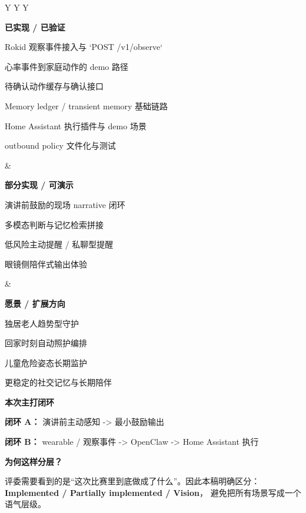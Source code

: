 \documentclass[11pt,fontset=none]{ctexart}
\newcommand{\PageDivider}{\vspace{0.7em}{\color{MiraMuted}\rule{\linewidth}{0.55pt}}\vspace{0.45em}}
\begin{document}
\begin{tabularx}{\linewidth}{Y Y Y}
\begin{greenbox}
\textbf{已实现 / 已验证}
\begin{tightitemize}
\item Rokid 观察事件接入与 `POST /v1/observe`
\item 心率事件到家庭动作的 demo 路径
\item 待确认动作缓存与确认接口
\item Memory ledger / transient memory 基础链路
\item Home Assistant 执行插件与 demo 场景
\item outbound policy 文件化与测试
\end{tightitemize}
\end{greenbox}
&
\begin{bluebox}
\textbf{部分实现 / 可演示}
\begin{tightitemize}
\item 演讲前鼓励的现场 narrative 闭环
\item 多模态判断与记忆检索拼接
\item 低风险主动提醒 / 私聊型提醒
\item 眼镜侧陪伴式输出体验
\end{tightitemize}
\end{bluebox}
&
\begin{accentbox}
\textbf{愿景 / 扩展方向}
\begin{tightitemize}
\item 独居老人趋势型守护
\item 回家时刻自动照护编排
\item 儿童危险姿态长期监护
\item 更稳定的社交记忆与长期陪伴
\end{tightitemize}
\end{accentbox}
\end{tabularx}

\PageDivider

\textbf{本次主打闭环}
\begin{tightitemize}
\item \textbf{闭环 A：} 演讲前主动感知 -> 最小鼓励输出
\item \textbf{闭环 B：} wearable / 观察事件 -> OpenClaw -> Home Assistant 执行
\end{tightitemize}

\begin{summarybox}
\textbf{为何这样分层？}\par
评委需要看到的是“这次比赛里到底做成了什么”。因此本稿明确区分：
\textbf{Implemented / Partially implemented / Vision}，
避免把所有场景写成一个语气层级。
\end{summarybox}
\end{document}
